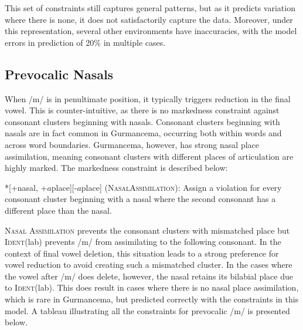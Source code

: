 \documentclass[output=paper,
modfonts
]{langscibook}
\begin{document}
This set of constraints still captures general patterns, but as it predicts variation where there is none, it does not satisfactorily capture the data. Moreover, under this representation, several other environments have inaccuracies, with the model errors in prediction of 20\% in multiple cases. 

\subsection{Prevocalic Nasals}

When /m/ is in penultimate position, it typically triggers reduction in the final vowel. This is counter-intuitive, as there is no markedness constraint against consonant clusters beginning with nasals. Consonant clusters beginning with nasals are in fact common in Gurmancema, occurring both within words and across word boundaries. Gurmancema, however, has strong nasal place assimilation, meaning consonant clusters with different places of articulation are highly marked. The markedness constraint is described below:

\ea
*[+nasal, +$a$place][-$a$place] (\textsc{NasalAssimilation}): Assign a violation for every 	consonant cluster beginning with a nasal where the second consonant has a 	different place than the nasal.
\z

\textsc{Nasal Assimilation} prevents the consonant clusters with mismatched place but \textsc{Ident}(lab) prevents /m/ from assimilating to the following consonant. In the context of final vowel deletion, this situation leads to a strong preference for vowel reduction to avoid creating such a mismatched cluster.  In the cases where the vowel after /m/ does delete, however, the nasal retains its bilabial place due to \textsc{Ident}(lab). This does result in cases where there is no nasal place assimilation, which is rare in Gurmancema, but predicted correctly with the constraints in this model. 
A tableau illustrating all the constraints for prevocalic /m/ is presented 
below. 
\pagebreak
\end{document}
